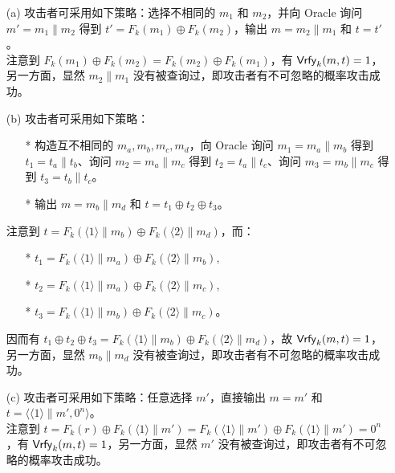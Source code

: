 \begin{questions}
        \begin{solution}
            \begin{enumerate}
                \item[(a)] 攻击者可采用如下策略：选择不相同的 $m_1$ 和 $m_2$，并向 Oracle 询问 $m'=m_1\parallel{m_2}$ 得到 $t'=F_k(m_1)\oplus{F_k}(m_2)$，输出 $m=m_2\parallel{m_1}$ 和 $t=t'$。\\
                注意到 $F_k(m_1)\oplus{F_k}(m_2)=F_k(m_2)\oplus{F_k}(m_1)$，有 $\mathsf{Vrfy}_k(m,t)=1$，另一方面，显然 $m_2\parallel{m_1}$ 没有被查询过，即攻击者有不可忽略的概率攻击成功。
                \item[(b)] 攻击者可采用如下策略：
                    \begin{enumerate}
                        \item[*] 构造互不相同的 $m_a, m_b, m_c, m_d$，向 Oracle 询问 $m_1=m_a\parallel{m_b}$ 得到 $t_1=t_a\parallel{t_b}$、询问 $m_2=m_a\parallel{m_c}$ 得到 $t_2=t_a\parallel{t_c}$、询问 $m_3=m_b\parallel{m_c}$ 得到 $t_3=t_b\parallel{t_c}$。
                        \item[*] 输出 $m=m_b\parallel{m_d}$ 和 $t=t_1\oplus{t_2}\oplus{t_3}$。
                    \end{enumerate}
                    注意到 $t=F_k(\langle{1}\rangle\parallel{m_b})\oplus{F_k(\langle{2}\rangle\parallel{m_d})}$，而：
                    \begin{enumerate}
                        \item[*] $t_1=F_k(\langle{1}\rangle\parallel{m_a})\oplus{F_k(\langle{2}\rangle\parallel{m_b})}$,
                        \item[*] $t_2=F_k(\langle{1}\rangle\parallel{m_a})\oplus{F_k(\langle{2}\rangle\parallel{m_c})}$,
                        \item[*] $t_3=F_k(\langle{1}\rangle\parallel{m_b})\oplus{F_k(\langle{2}\rangle\parallel{m_c})}$。
                    \end{enumerate}
                    因而有 $t_1\oplus{t_2}\oplus{t_3}=F_k(\langle{1}\rangle\parallel{m_b})\oplus{F_k(\langle{2}\rangle\parallel{m_d})}$，故 $\mathsf{Vrfy}_k(m,t)=1$，另一方面，显然 $m_b\parallel{m_d}$ 没有被查询过，即攻击者有不可忽略的概率攻击成功。
                \item[(c)] 攻击者可采用如下策略：任意选择 $m'$，直接输出 $m=m'$ 和 $t=\langle\langle{1}\rangle\parallel{m'},0^n\rangle$。\\
                注意到 $t=F_k(r)\oplus{F_k}(\langle{1}\rangle\parallel{m'})=F_k(\langle{1}\rangle\parallel{m'})\oplus{F_k}(\langle{1}\rangle\parallel{m'})=0^n$，有 $\mathsf{Vrfy}_k(m,t)=1$，另一方面，显然 $m'$ 没有被查询过，即攻击者有不可忽略的概率攻击成功。
            \end{enumerate}
        \end{solution}


\end{questions}
